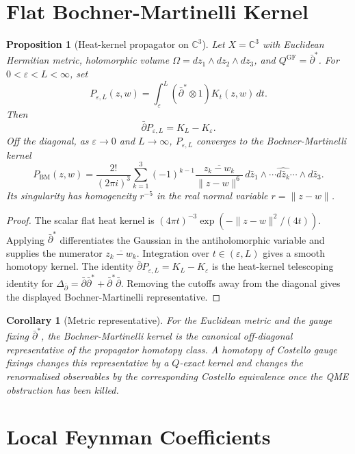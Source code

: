\documentclass[11pt]{article}
\newtheorem{proposition}[theorem]{Proposition}
\newtheorem{corollary}[theorem]{Corollary}
\theoremstyle{definition}
\theoremstyle{remark}
\providecommand{\C}{\mathbb{C}}
\providecommand{\dbar}{\bar{\partial}}
\providecommand{\dbarstar}{\bar{\partial}^{\ast}}
\begin{document}
\section{Flat Bochner-Martinelli Kernel}
\label{sec:bm-kernel}

\begin{proposition}[Heat-kernel propagator on $\C^3$]
\label{prop:bm-propagator}
Let $X=\C^3$ with Euclidean Hermitian metric, holomorphic volume
$\Omega=dz_1\wedge dz_2\wedge dz_3$, and
$Q^{\mathrm{GF}}=\dbarstar$.  For $0<\varepsilon<L<\infty$, set
\[
  P_{\varepsilon,L}(z,w)
  =
  \int_{\varepsilon}^{L}
  (\dbarstar\otimes1)K_t(z,w)\,dt .
\]
Then
\[
  \dbar P_{\varepsilon,L}=K_L-K_\varepsilon .
\]
Off the diagonal, as $\varepsilon\to0$ and $L\to\infty$,
$P_{\varepsilon,L}$ converges to the Bochner-Martinelli kernel
\[
  P_{\mathrm{BM}}(z,w)
  =
  \frac{2!}{(2\pi i)^3}
  \sum_{k=1}^{3}(-1)^{k-1}
  \frac{\overline{z_k-w_k}}{\|z-w\|^6}\,
  d\bar z_1\wedge\cdots\widehat{d\bar z_k}\cdots\wedge d\bar z_3 .
\]
Its singularity has homogeneity $r^{-5}$ in the real normal variable
$r=\|z-w\|$.
\end{proposition}

\begin{proof}
The scalar flat heat kernel is
$(4\pi t)^{-3}\exp(-\|z-w\|^2/(4t))$.  Applying $\dbarstar$ differentiates
the Gaussian in the antiholomorphic variable and supplies the numerator
$\overline{z_k-w_k}$.  Integration over $t\in(\varepsilon,L)$ gives a
smooth homotopy kernel.  The identity
$\dbar P_{\varepsilon,L}=K_L-K_\varepsilon$ is the heat-kernel
telescoping identity for
$\Delta_{\dbar}=\dbar\dbarstar+\dbarstar\dbar$.  Removing the cutoffs
away from the diagonal gives the displayed Bochner-Martinelli
representative.
\end{proof}

\begin{corollary}[Metric representative]
\label{cor:metric-representative}
For the Euclidean metric and the gauge fixing $\dbarstar$, the
Bochner-Martinelli kernel is the canonical off-diagonal representative
of the propagator homotopy class.  A homotopy of Costello gauge fixings
changes this representative by a $Q$-exact kernel and changes the
renormalised observables by the corresponding Costello equivalence once
the QME obstruction has been killed.
\end{corollary}

\section{Local Feynman Coefficients}
\label{sec:local-feynman-coefficients}
\end{document}
